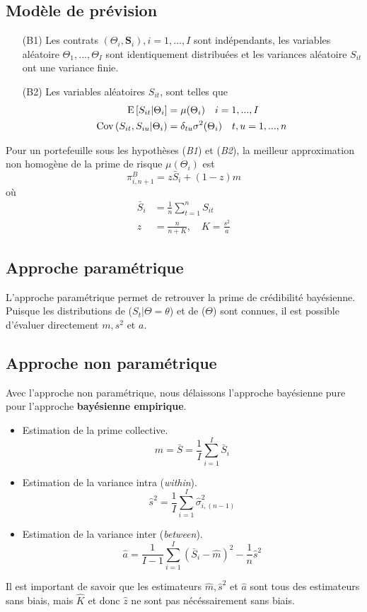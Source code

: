 \documentclass[10pt, french]{article}
\begin{document}
\begin{multicols*}{3}
\subsection*{Modèle de prévision}
\begin{itemize}
    \item[(B1)] Les contrats $(\Theta_i, \mathbf{S}_i), i = 1,...,I$ sont indépendants, les variables aléatoire $\Theta_1,...,\Theta_I$ sont identiquement distribuées et les variances aléatoire $S_{it}$ ont une variance finie.
    \item[(B2)] Les variables aléatoires $S_{it}$, sont telles que
    \begin{align*}
        \mathrm{E} \left[ S_{it}|\Theta_i \right] &= \mu(\Theta_i)\quad i = 1,...,I \\
        \mathrm{Cov} \left( S_{it},S_{iu}|\Theta_i \right) &= \delta_{tu}\sigma^2(\Theta_i)\quad t,u = 1,...,n
    \end{align*}
\end{itemize}
\begin{definition}
    Pour un portefeuille sous les hypothèses (\emph{B1}) et (\emph{B2}), la meilleur approximation non homogène de la prime de risque $\mu(\Theta_i)$ est
    \[ \pi_{i,n+1}^B = z\bar{S}_i + (1 - z)m \]
    où
    \begin{align*}
        \bar{S}_i &= \frac{1}{n} \sum_{t=1}^n S_{it} \\
        z &= \frac{n}{n+K},\quad K = \frac{s^2}{a}
    \end{align*}
\end{definition}

\subsection*{Approche paramétrique}
L'approche paramétrique permet de retrouver la prime de crédibilité bayésienne. Puisque les distributions de ($S_t|\Theta = \theta$) et de ($\Theta$) sont connues, il est possible d'évaluer directement $m, s^2$ et $a$.

\subsection*{Approche non paramétrique}
Avec l'approche non paramétrique, nous délaissons l'approche bayésienne pure pour l'approche \textbf{bayésienne empirique}.
\begin{itemize}
    \item Estimation de la prime collective. \[ \hat{m} = \bar{S} =  \frac{1}{I} \sum_{i=1}^I \bar{S}_i \]
    \item Estimation de la variance intra (\emph{within}). \[ \hat{s}^2 = \frac{1}{I} \sum_{i=1}^I \hat{\sigma}_{i,(n-1)}^2 \]
    \item Estimation de la variance inter (\emph{between}). \[ \hat{a} = \frac{1}{I-1} \sum_{i=1}^I (\bar{S}_i - \hat{m})^2 - \frac{1}{n} \hat{s}^2 \]
\end{itemize}
Il est important de savoir que les estimateurs $\hat{m}, \hat{s}^2$ et $\hat{a}$ sont tous des estimateurs sans biais, mais $\hat{K}$ et donc $\hat{z}$ ne sont pas nécéssairement sans biais.


\end{multicols*}
\end{document}
